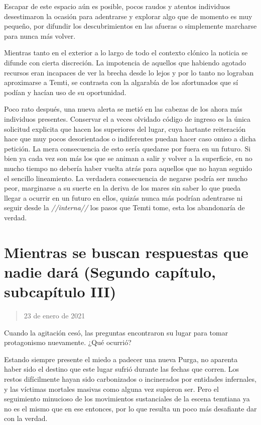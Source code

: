 \documentclass[
  spanish,
]{book}
\begin{document}
Escapar de este espacio aún es posible, pocos raudos y atentos individuos desestimaron la ocasión para adentrarse y explorar algo que de momento es muy pequeño, por difundir los descubrimientos en las afueras o simplemente marcharse para nunca más volver.

Mientras tanto en el exterior a lo largo de todo el contexto clónico la noticia se difunde con cierta discreción. La impotencia de aquellos que habiendo agotado recursos eran incapaces de ver la brecha desde lo lejos y por lo tanto no lograban aproximarse a Temti, se contrasta con la algarabía de los afortunados que sí podían y hacían uso de su oportunidad.

Poco rato después, una nueva alerta se metió en las cabezas de los ahora más individuos presentes. Conservar el a veces olvidado código de ingreso es la única solicitud explicita que hacen los superiores del lugar, cuya hartante reiteración hace que muy pocos desorientados o indiferentes puedan hacer caso omiso a dicha petición. La mera consecuencia de esto sería quedarse por fuera en un futuro. Si bien ya cada vez son más los que se animan a salir y volver a la superficie, en no mucho tiempo no debería haber vuelta atrás para aquellos que no hayan seguido el sencillo lineamiento. La verdadera consecuencia de negarse podría ser mucho peor, marginarse a su suerte en la deriva de los mares sin saber lo que pueda llegar a ocurrir en un futuro en ellos, quizás nunca más podrían adentrarse ni seguir desde la \emph{//interna//} los pasos que Temti tome, esta los abandonaría de verdad.

\hypertarget{mientras-se-buscan-respuestas-que-nadie-daruxe1-segundo-capuxedtulo-subcapuxedtulo-iii}{%
\section{Mientras se buscan respuestas que nadie dará (Segundo capítulo, subcapítulo III)}\label{mientras-se-buscan-respuestas-que-nadie-daruxe1-segundo-capuxedtulo-subcapuxedtulo-iii}}

\begin{quote}
23 de enero de 2021
\end{quote}

Cuando la agitación cesó, las preguntas encontraron su lugar para tomar protagonismo nuevamente. ¿Qué ocurrió?

Estando siempre presente el miedo a padecer una nueva Purga, no aparenta haber sido el destino que este lugar sufrió durante las fechas que corren. Los restos difícilmente hayan sido carbonizados o incinerados por entidades infernales, y las víctimas mortales masivas como alguna vez supieron ser. Pero el seguimiento minucioso de los movimientos sustanciales de la escena temtiana ya no es el mismo que en ese entonces, por lo que resulta un poco más desafiante dar con la verdad.
\end{document}
